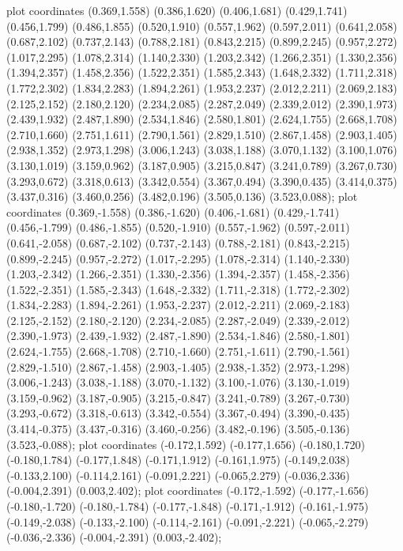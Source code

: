  plot coordinates {(0.369,1.558) (0.386,1.620) (0.406,1.681) (0.429,1.741) (0.456,1.799) (0.486,1.855) (0.520,1.910) (0.557,1.962) (0.597,2.011) (0.641,2.058) (0.687,2.102) (0.737,2.143) (0.788,2.181) (0.843,2.215) (0.899,2.245) (0.957,2.272) (1.017,2.295) (1.078,2.314) (1.140,2.330) (1.203,2.342) (1.266,2.351) (1.330,2.356) (1.394,2.357) (1.458,2.356) (1.522,2.351) (1.585,2.343) (1.648,2.332) (1.711,2.318) (1.772,2.302) (1.834,2.283) (1.894,2.261) (1.953,2.237) (2.012,2.211) (2.069,2.183) (2.125,2.152) (2.180,2.120) (2.234,2.085) (2.287,2.049) (2.339,2.012) (2.390,1.973) (2.439,1.932) (2.487,1.890) (2.534,1.846) (2.580,1.801) (2.624,1.755) (2.668,1.708) (2.710,1.660) (2.751,1.611) (2.790,1.561) (2.829,1.510) (2.867,1.458) (2.903,1.405) (2.938,1.352) (2.973,1.298) (3.006,1.243) (3.038,1.188) (3.070,1.132) (3.100,1.076) (3.130,1.019) (3.159,0.962) (3.187,0.905) (3.215,0.847) (3.241,0.789) (3.267,0.730) (3.293,0.672) (3.318,0.613) (3.342,0.554) (3.367,0.494) (3.390,0.435) (3.414,0.375) (3.437,0.316) (3.460,0.256) (3.482,0.196) (3.505,0.136) (3.523,0.088)};
 plot coordinates {(0.369,-1.558) (0.386,-1.620) (0.406,-1.681) (0.429,-1.741) (0.456,-1.799) (0.486,-1.855) (0.520,-1.910) (0.557,-1.962) (0.597,-2.011) (0.641,-2.058) (0.687,-2.102) (0.737,-2.143) (0.788,-2.181) (0.843,-2.215) (0.899,-2.245) (0.957,-2.272) (1.017,-2.295) (1.078,-2.314) (1.140,-2.330) (1.203,-2.342) (1.266,-2.351) (1.330,-2.356) (1.394,-2.357) (1.458,-2.356) (1.522,-2.351) (1.585,-2.343) (1.648,-2.332) (1.711,-2.318) (1.772,-2.302) (1.834,-2.283) (1.894,-2.261) (1.953,-2.237) (2.012,-2.211) (2.069,-2.183) (2.125,-2.152) (2.180,-2.120) (2.234,-2.085) (2.287,-2.049) (2.339,-2.012) (2.390,-1.973) (2.439,-1.932) (2.487,-1.890) (2.534,-1.846) (2.580,-1.801) (2.624,-1.755) (2.668,-1.708) (2.710,-1.660) (2.751,-1.611) (2.790,-1.561) (2.829,-1.510) (2.867,-1.458) (2.903,-1.405) (2.938,-1.352) (2.973,-1.298) (3.006,-1.243) (3.038,-1.188) (3.070,-1.132) (3.100,-1.076) (3.130,-1.019) (3.159,-0.962) (3.187,-0.905) (3.215,-0.847) (3.241,-0.789) (3.267,-0.730) (3.293,-0.672) (3.318,-0.613) (3.342,-0.554) (3.367,-0.494) (3.390,-0.435) (3.414,-0.375) (3.437,-0.316) (3.460,-0.256) (3.482,-0.196) (3.505,-0.136) (3.523,-0.088)};
 plot coordinates {(-0.172,1.592) (-0.177,1.656) (-0.180,1.720) (-0.180,1.784) (-0.177,1.848) (-0.171,1.912) (-0.161,1.975) (-0.149,2.038) (-0.133,2.100) (-0.114,2.161) (-0.091,2.221) (-0.065,2.279) (-0.036,2.336) (-0.004,2.391) (0.003,2.402)};
 plot coordinates {(-0.172,-1.592) (-0.177,-1.656) (-0.180,-1.720) (-0.180,-1.784) (-0.177,-1.848) (-0.171,-1.912) (-0.161,-1.975) (-0.149,-2.038) (-0.133,-2.100) (-0.114,-2.161) (-0.091,-2.221) (-0.065,-2.279) (-0.036,-2.336) (-0.004,-2.391) (0.003,-2.402)};
